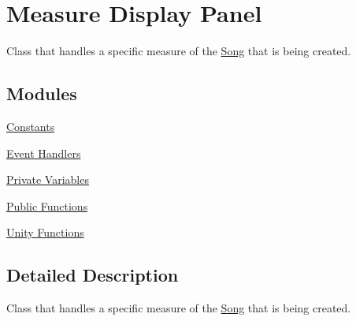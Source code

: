 \hypertarget{group___doc_s_c___m_d_p}{}\section{Measure Display Panel}
\label{group___doc_s_c___m_d_p}


Class that handles a specific measure of the \hyperlink{class_song}{Song} that is being created.  


\subsection*{Modules}
\begin{DoxyCompactItemize}
\item 
\hyperlink{group___s_c___m_d_p_const}{Constants}
\item 
\hyperlink{group___s_c___m_d_p_handlers}{Event Handlers}
\item 
\hyperlink{group___s_c___m_d_p_priv_var}{Private Variables}
\item 
\hyperlink{group___s_c___m_d_p_pub_func}{Public Functions}
\item 
\hyperlink{group___s_c___m_d_p_unity}{Unity Functions}
\end{DoxyCompactItemize}


\subsection{Detailed Description}
Class that handles a specific measure of the \hyperlink{class_song}{Song} that is being created. 

